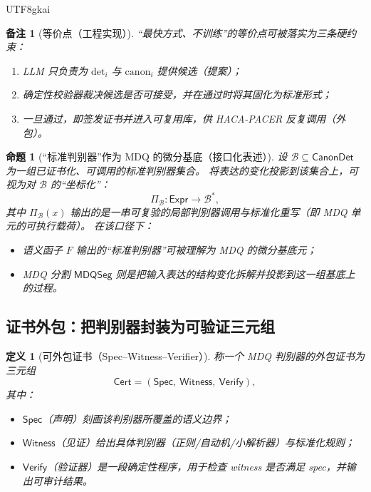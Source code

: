 \documentclass[12pt]{article}
\newtheorem{definition}{定义}[section]
\newtheorem{proposition}{命题}[section]
\newtheorem{remark}{备注}[section]
\begin{document}
\begin{CJK*}{UTF8}{gkai}
\begin{remark}[等价点（工程实现）]
“最快方式、不训练”的等价点可被落实为三条硬约束：
\begin{enumerate}
  \item LLM 只负责为 $\mathrm{det}_i$ 与 $\mathrm{canon}_i$ 提供候选（提案）；
  \item 确定性校验器裁决候选是否可接受，并在通过时将其固化为标准形式；
  \item 一旦通过，即签发证书并进入可复用库，供 HACA-PACER 反复调用（外包）。
\end{enumerate}
\end{remark}

\begin{proposition}[“标准判别器”作为 MDQ 的微分基底（接口化表述）]
设 $\mathcal{B}\subseteq \mathsf{CanonDet}$ 为一组已证书化、可调用的标准判别器集合。
将表达的变化投影到该集合上，可视为对 $\mathcal{B}$ 的“坐标化”：
\[
\Pi_{\mathcal{B}}:\mathsf{Expr}\to \mathcal{B}^{*},
\]
其中 $\Pi_{\mathcal{B}}(x)$ 输出的是一串可复验的局部判别器调用与标准化重写（即 MDQ 单元的可执行载荷）。
在该口径下：
\begin{itemize}
  \item 语义函子 $F$ 输出的“标准判别器”可被理解为 MDQ 的微分基底元；
  \item MDQ 分割 $\mathsf{MDQSeg}$ 则是把输入表达的结构变化拆解并投影到这一组基底上的过程。
\end{itemize}
\end{proposition}

\subsection{证书外包：把判别器封装为可验证三元组}
\label{subsec:mdq-certificate}

\begin{definition}[可外包证书（Spec--Witness--Verifier）]
称一个 MDQ 判别器的外包证书为三元组
\[
\mathsf{Cert}=(\mathsf{Spec},\ \mathsf{Witness},\ \mathsf{Verify}),
\]
其中：
\begin{itemize}
  \item $\mathsf{Spec}$（声明）刻画该判别器所覆盖的语义边界；
  \item $\mathsf{Witness}$（见证）给出具体判别器（正则/自动机/小解析器）与标准化规则；
  \item $\mathsf{Verify}$（验证器）是一段确定性程序，用于检查 witness 是否满足 spec，并输出可审计结果。
\end{itemize}
\end{definition}


\end{CJK*}
\end{document}
